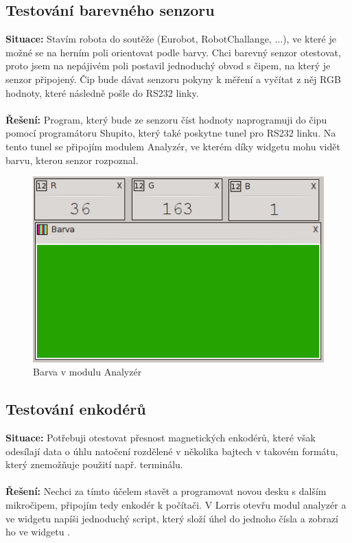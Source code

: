\documentclass[12pt, a4paper, oneside]{article}
\begin{document}
\subsection{Testování barevného senzoru}
{\bf Situace:} Stavím robota do soutěže (Eurobot, RobotChallange, ...), ve které je možné se na herním poli orientovat podle barvy. Chci barevný senzor otestovat, proto jsem na nepájivém poli postavil jednoduchý obvod s čipem, na který je senzor připojený. Čip bude dávat senzoru pokyny k měření a vyčítat z něj RGB hodnoty, které následně pošle do RS232 linky.\\
\\
{\bf Řešení:} Program, který bude ze senzoru číst hodnoty naprogramuji do čipu pomocí programátoru Shupito, který také poskytne tunel pro RS232 linku. Na tento tunel se připojím modulem Analyzér, ve kterém díky widgetu  mohu vidět barvu, kterou senzor rozpoznal.

\begin{figure}[h]
\begin{center}
\includegraphics{img/use_color.png}
\caption{Barva v modulu Analyzér}
\label{Terminal}
\end{center}
\end{figure}

\newpage
\subsection{Testování enkodérů}
{\bf Situace:} Potřebuji otestovat přesnost magnetických enkodérů, které však odesílají data o úhlu natočení rozdělené v několika bajtech v takovém formátu, který znemožňuje použití např. terminálu.\\
\\
{\bf Řešení:} Nechci za tímto účelem stavět a programovat novou desku s dalším mikročipem, připojím tedy enkodér k počítači. V Lorris otevřu modul analyzér a ve widgetu  napíši  jednoduchý script, který složí úhel do jednoho čísla a zobrazí ho ve widgetu .
\end{document}

